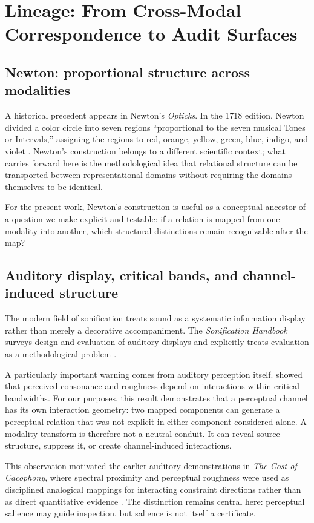 \documentclass[11pt]{article}
\begin{document}
\section{Lineage: From Cross-Modal Correspondence to Audit Surfaces}

\subsection{Newton: proportional structure across modalities}
A historical precedent appears in Newton's \emph{Opticks}. In the 1718 edition, Newton divided a color circle into seven regions ``proportional to the seven musical Tones or Intervals,'' assigning the regions to red, orange, yellow, green, blue, indigo, and violet \citep{newton1718opticks}. Newton's construction belongs to a different scientific context; what carries forward here is the methodological idea that relational structure can be transported between representational domains without requiring the domains themselves to be identical.

For the present work, Newton's construction is useful as a conceptual ancestor of a question we make explicit and testable: if a relation is mapped from one modality into another, which structural distinctions remain recognizable after the map?

\subsection{Auditory display, critical bands, and channel-induced structure}
The modern field of sonification treats sound as a systematic information display rather than merely a decorative accompaniment. The \emph{Sonification Handbook} surveys design and evaluation of auditory displays and explicitly treats evaluation as a methodological problem \citep{hermann2011sonification,bonebright2011evaluation}.

A particularly important warning comes from auditory perception itself. \citet{plomp1965tonal} showed that perceived consonance and roughness depend on interactions within critical bandwidths. For our purposes, this result demonstrates that a perceptual channel has its own interaction geometry: two mapped components can generate a perceptual relation that was not explicit in either component considered alone. A modality transform is therefore not a neutral conduit. It can reveal source structure, suppress it, or create channel-induced interactions.

This observation motivated the earlier auditory demonstrations in \emph{The Cost of Cacophony}, where spectral proximity and perceptual roughness were used as disciplined analogical mappings for interacting constraint directions rather than as direct quantitative evidence \citep{tiffany2026cacophony}. The distinction remains central here: perceptual salience may guide inspection, but salience is not itself a certificate.
\end{document}
